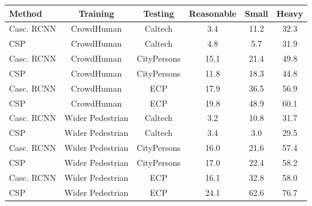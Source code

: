 \documentclass[final]{cvpr}
\newcommand{\caltecha}[1]{{Caltech}}
\newcommand{\citypersona}[1]{{CityPersons}}
\newcommand{\ecpa}[1]{{ECP}}
\newcommand{\widerpersona}[1]{{Wider Pedestrian}}
\newcommand{\crowdhumana}[1]{{CrowdHuman}}
\begin{document}
 




 


\begin{table*}[tb]
\centering
\caption{Benchmarking with CrowdHuman and Wider Pedestrian dataset.}
\label{tab:icon-ch-wider}
\begin{tabular}{l|c|c|c|c|c}
\hline
Method & Training & Testing             & Reasonable & Small & Heavy \\ \hline
Casc. RCNN & \crowdhumana{}& \caltecha{}    & 3.4  &   11.2   & 32.3 \\ \hline
CSP & \crowdhumana{}& \caltecha{}    &  4.8 &  5.7    & 31.9 \\ \hline
Casc. RCNN& \crowdhumana{}& \citypersona{}    & 15.1   & 21.4      & 49.8 \\ \hline
CSP & \crowdhumana{}& \citypersona{}    & 11.8   & 18.3      & 44.8 \\ \hline
Casc. RCNN & \crowdhumana{}& \ecpa{} & 17.9  & 36.5   & 56.9  \\ \hline

CSP & \crowdhumana{}& \ecpa{} & 19.8  & 48.9   & 60.1  \\ \hline
\hline
Casc. RCNN & \widerpersona{}&\caltecha{}    & 3.2  &   10.8   & 31.7 \\ \hline
CSP & \widerpersona{}&\caltecha{}    & 3.4  &    3.0  & 29.5 \\ \hline
Casc. RCNN& \widerpersona{}&\citypersona{}    & 16.0   & 21.6      & 57.4 \\ \hline
CSP & \widerpersona{}&\citypersona{}    & 17.0   & 22.4 & 58.2 \\ \hline
Casc. RCNN & \widerpersona{}&\ecpa{} & 16.1  & 32.8   & 58.0  \\ \hline
CSP & \widerpersona{}&\ecpa{} &  24.1 & 62.6   & 76.7  \\ \hline
\end{tabular}
\end{table*}
\end{document}
